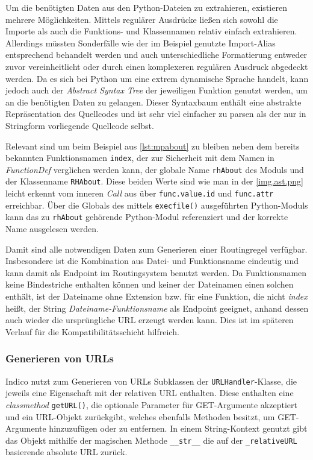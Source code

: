 Um die benötigten Daten aus den Python-Dateien zu extrahieren, existieren mehrere Möglichkeiten.
Mittels regulärer Ausdrücke ließen sich sowohl die Importe als auch die Funktions- und Klassennamen
relativ einfach extrahieren. Allerdings müssten Sonderfälle wie der im Beispiel genutzte
Import-Alias entsprechend behandelt werden und auch unterschiedliche Formatierung entweder zuvor
vereinheitlicht oder durch einen komplexeren regulären Ausdruck abgedeckt werden. Da es sich bei
Python um eine extrem dynamische Sprache handelt, kann jedoch auch der \emph{Abstract Syntax Tree}
der jeweiligen Funktion genutzt werden, um an die benötigten Daten zu gelangen. Dieser Syntaxbaum
enthält eine abstrakte Repräsentation des Quellcodes und ist sehr viel einfacher zu parsen als der
nur in Stringform vorliegende Quellcode selbst.


Relevant sind um beim Beispiel aus \autoref{lst:mpabout} zu bleiben neben dem bereits bekannten
Funktionsnamen \lstinline{index}, der zur Sicherheit mit dem Namen in \emph{FunctionDef} verglichen
werden kann, der globale Name \lstinline{rhAbout} des Moduls und der Klassenname
\lstinline{RHAbout}. Diese beiden Werte sind wie man in der \autoref{img.ast.png} leicht erkennt vom
inneren \emph{Call} aus über \lstinline{func.value.id} und \lstinline{func.attr} erreichbar. Über
die Globals des mittels \lstinline{execfile()} ausgeführten Python-Moduls kann das zu
\lstinline{rhAbout} gehörende Python-Modul referenziert und der korrekte Name ausgelesen werden.

Damit sind alle notwendigen Daten zum Generieren einer Routingregel verfügbar. Insbesondere ist die
Kombination aus Datei- und Funktionsname eindeutig  und kann damit als Endpoint im Routingsystem
benutzt werden. Da Funktionsnamen keine Bindestriche enthalten können und keiner der Dateinamen
einen solchen enthält, ist der Dateiname ohne Extension bzw. für eine Funktion, die nicht
\emph{index} heißt, der String \emph{Dateiname-Funktionsname} als Endpoint geeignet, anhand dessen
auch wieder die ursprüngliche URL erzeugt werden kann. Dies ist im späteren Verlauf für die
Kompatibilitätsschicht hilfreich.


\subsubsection{Generieren von URLs}

Indico nutzt zum Generieren von URLs Subklassen der \lstinline{URLHandler}-Klasse, die jeweils eine
Eigenschaft mit der relativen URL enthalten. Diese enthalten eine \emph{classmethod}
\lstinline{getURL()}, die optionale Parameter für GET-Argumente akzeptiert und ein URL-Objekt
zurückgibt, welches ebenfalls Methoden besitzt, um GET-Argumente hinzuzufügen oder zu entfernen.
In einem String-Kontext genutzt gibt das Objekt mithilfe der magischen Methode \lstinline{__str__}
die auf der \lstinline{_relativeURL} basierende absolute URL zurück.

